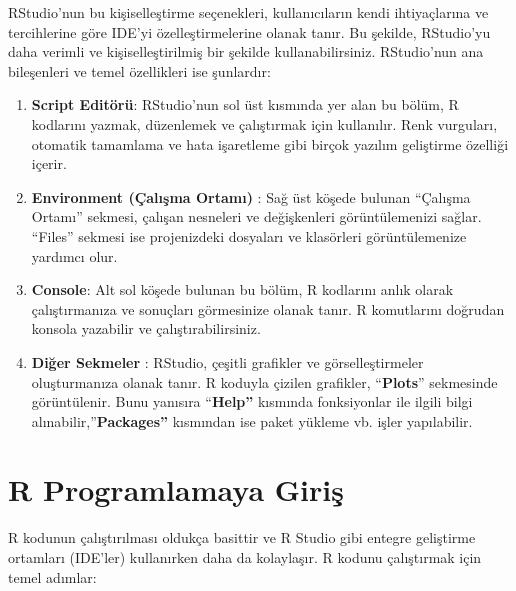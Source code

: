 \documentclass[
  letterpaper,
  DIV=11,
  numbers=noendperiod]{scrreprt}
\begin{document}
RStudio'nun bu kişiselleştirme seçenekleri, kullanıcıların kendi
ihtiyaçlarına ve tercihlerine göre IDE'yi özelleştirmelerine olanak
tanır. Bu şekilde, RStudio'yu daha verimli ve kişiselleştirilmiş bir
şekilde kullanabilirsiniz. RStudio'nun ana bileşenleri ve temel
özellikleri ise şunlardır:

\begin{enumerate}
\def\labelenumi{\arabic{enumi}.}
\item
  \textbf{Script Editörü}: RStudio'nun sol üst kısmında yer alan bu
  bölüm, R kodlarını yazmak, düzenlemek ve çalıştırmak için kullanılır.
  Renk vurguları, otomatik tamamlama ve hata işaretleme gibi birçok
  yazılım geliştirme özelliği içerir.
\item
  \textbf{Environment (Çalışma Ortamı)} : Sağ üst köşede bulunan
  ``Çalışma Ortamı'' sekmesi, çalışan nesneleri ve değişkenleri
  görüntülemenizi sağlar. ``Files'' sekmesi ise projenizdeki dosyaları
  ve klasörleri görüntülemenize yardımcı olur.
\item
  \textbf{Console}: Alt sol köşede bulunan bu bölüm, R kodlarını anlık
  olarak çalıştırmanıza ve sonuçları görmesinize olanak tanır. R
  komutlarını doğrudan konsola yazabilir ve çalıştırabilirsiniz.
\item
  \textbf{Diğer Sekmeler} : RStudio, çeşitli grafikler ve
  görselleştirmeler oluşturmanıza olanak tanır. R koduyla çizilen
  grafikler, ``\textbf{Plots}'' sekmesinde görüntülenir. Bunu yanısıra
  ``\textbf{Help''} kısmında fonksiyonlar ile ilgili bilgi
  alınabilir,''\textbf{Packages''} kısmından ise paket yükleme vb. işler
  yapılabilir.
\end{enumerate}

\part{R Programlamaya Giriş}

R kodunun çalıştırılması oldukça basittir ve R Studio gibi entegre
geliştirme ortamları (IDE'ler) kullanırken daha da kolaylaşır. R kodunu
çalıştırmak için temel adımlar:
\end{document}
